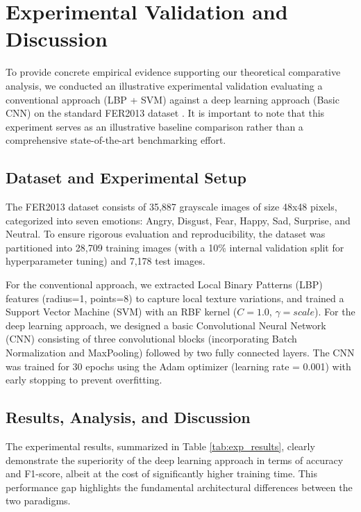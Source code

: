 \documentclass[journal]{IEEEtran}
\begin{document}

\section{Experimental Validation and Discussion}
To provide concrete empirical evidence supporting our theoretical comparative analysis, we conducted an illustrative experimental validation evaluating a conventional approach (LBP + SVM) against a deep learning approach (Basic CNN) on the standard FER2013 dataset \cite{ref:goodfellow2013}. It is important to note that this experiment serves as an illustrative baseline comparison rather than a comprehensive state-of-the-art benchmarking effort.

\subsection{Dataset and Experimental Setup}
The FER2013 dataset consists of 35,887 grayscale images of size 48x48 pixels, categorized into seven emotions: Angry, Disgust, Fear, Happy, Sad, Surprise, and Neutral. To ensure rigorous evaluation and reproducibility, the dataset was partitioned into 28,709 training images (with a 10\% internal validation split for hyperparameter tuning) and 7,178 test images.

For the conventional approach, we extracted Local Binary Patterns (LBP) features (radius=1, points=8) to capture local texture variations, and trained a Support Vector Machine (SVM) with an RBF kernel ($C=1.0$, $\gamma=scale$). For the deep learning approach, we designed a basic Convolutional Neural Network (CNN) consisting of three convolutional blocks (incorporating Batch Normalization and MaxPooling) followed by two fully connected layers. The CNN was trained for 30 epochs using the Adam optimizer (learning rate = 0.001) with early stopping to prevent overfitting.

\subsection{Results, Analysis, and Discussion}
The experimental results, summarized in Table \ref{tab:exp_results}, clearly demonstrate the superiority of the deep learning approach in terms of accuracy and F1-score, albeit at the cost of significantly higher training time. This performance gap highlights the fundamental architectural differences between the two paradigms.
\end{document}
